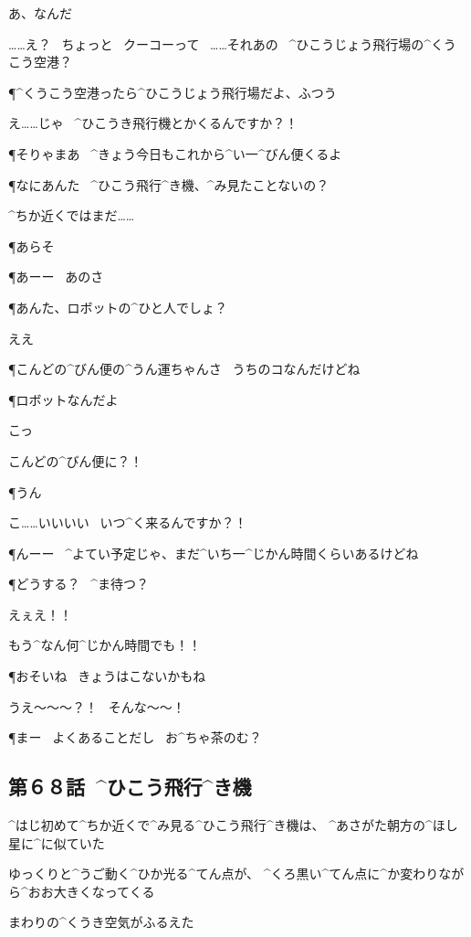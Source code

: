 \A あ、なんだ

\A ……え？
\ ちょっと
\ クーコーって
\ ……それあの
\ ^{ひこうじょう}{飛行場}の^{くうこう}{空港}？

\P ^{くうこう}{空港}ったら^{ひこうじょう}{飛行場}だよ、ふつう

\page
\A え……じゃ
\ ^{ひこうき}{飛行機}とかくるんですか？！

\P そりゃまあ
\ ^{きょう}{今日}もこれから^{い}{一}^{びん}{便}くるよ

\P なにあんた
\ ^{ひこう}{飛行}^{き}{機}、^{み}{見}たことないの？

\A ^{ちか}{近}くではまだ……

\P あらそ

\P あーー
\ あのさ

\page
\P あんた、ロボットの^{ひと}{人}でしょ？

\A ええ

\P こんどの^{びん}{便}の^{うん}{運}ちゃんさ
\ うちのコなんだけどね

\P ロボットなんだよ

\A こっ

\A こんどの^{びん}{便}に？！

\P うん

\page
\A こ……いいいい
\ いつ^{く}{来}るんですか？！

\P んーー
\ ^{よてい}{予定}じゃ、まだ^{いち}{一}^{じかん}{時間}くらいあるけどね

\P どうする？
\ ^{ま}{待}つ？

\A えぇえ！！

\A もう^{なん}{何}^{じかん}{時間}でも！！

\page[36]
\P おそいね
\ きょうはこないかもね

\A うえ〜〜〜？！
\ そんな〜〜！

\P まー
\ よくあることだし
\ お^{ちゃ}{茶}のむ？


\subsection{第６８話\ ^{ひこう}{飛行}^{き}{機}}

\page[38]
\A ^{はじ}{初}めて^{ちか}{近}くで^{み}{見}る^{ひこう}{飛行}^{き}{機}は、
^{あさがた}{朝方}の^{ほし}{星}に^{に}{似}ていた

\A ゆっくりと^{うご}{動}く^{ひか}{光}る^{てん}{点}が、
^{くろ}{黒}い^{てん}{点}に^{か}{変}わりながら^{おお}{大}きくなってくる

\page
\A まわりの^{くうき}{空気}がふるえた

